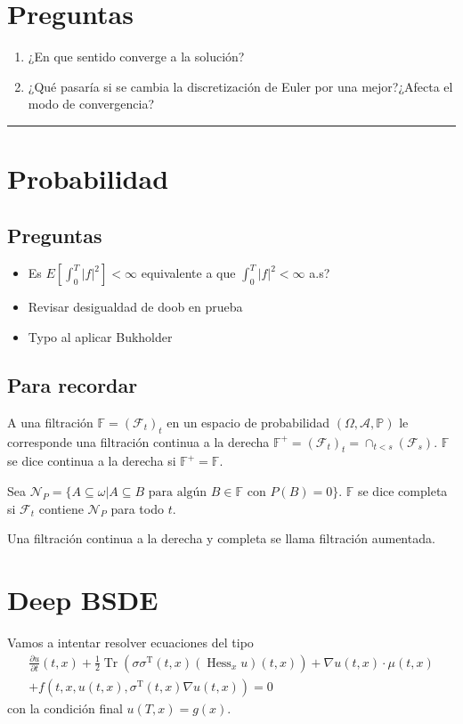 \documentclass{article}
\newcommand{\HRule}{\rule{\linewidth}{0.5mm}}
\newenvironment{recordar}[1][Recordar]
{\begin{tcolorbox}[breakable,colback=red!10!white,colframe=red!50!blue,title=Recordar: #1 ,enhanced jigsaw]
	
}{\end{tcolorbox}}
\begin{document}
    \section*{Preguntas}
	\begin{enumerate}
	\item ¿En que sentido converge a la solución?
	\item ¿Qué pasaría si se cambia la discretización de Euler por una mejor?¿Afecta el modo de convergencia?
	\end{enumerate}
    \HRule\par
    \section*{Probabilidad}
    \subsection*{Preguntas}
    \begin{itemize}
    	\item Es $E[\int_{0}^{T} |f|^2]<\infty$ equivalente a que $\int_{0}^{T}|f|^2<\infty$ a.s?
    	\item Revisar desigualdad de doob en prueba
    	\item Typo al aplicar Bukholder
    \end{itemize}
    \subsection*{Para recordar}
    \begin{recordar}[Filtración aumentada]
    	A una filtración $\mathbb{F}=(\mathcal{F}_t)_t$ en un espacio de probabilidad $(\Omega,\mathcal{A},\mathbb{P})$ le corresponde una filtración continua a la derecha $\mathbb{F}^+=(\mathcal{F}_t)_t=\cap_{t<s}(\mathcal{F}_s)$. $\mathbb{F}$ se dice continua a la derecha si $\mathbb{F}^+=\mathbb{F}$.
    	
    	Sea $\mathcal{N}_P=\{A\subseteq \omega | A\subseteq B \text{ para algún } B\in \mathbb{F} \text{ con } P(B)=0\}$. $\mathbb{F}$ se dice completa si $\mathcal{F}_t$ contiene $\mathcal{N}_P$ para todo $t$.
    	
    	Una filtración continua a la derecha y completa se llama filtración aumentada.
    \end{recordar}
	\section*{Deep BSDE}
	Vamos a intentar resolver ecuaciones del tipo 
	\begin{equation}
		\begin{gathered}
			\frac{\partial u}{\partial t}(t, x)+\frac{1}{2} \operatorname{Tr}\left(\sigma \sigma^{\mathrm{T}}(t, x)\left(\operatorname{Hess}_x u\right)(t, x)\right)+\nabla u(t, x) \cdot \mu(t, x) \\
			+f\left(t, x, u(t, x), \sigma^{\mathrm{T}}(t, x) \nabla u(t, x)\right)=0
		\end{gathered}
	\end{equation}
con la condición final $u(T,x)=g(x)$.
\end{document}
